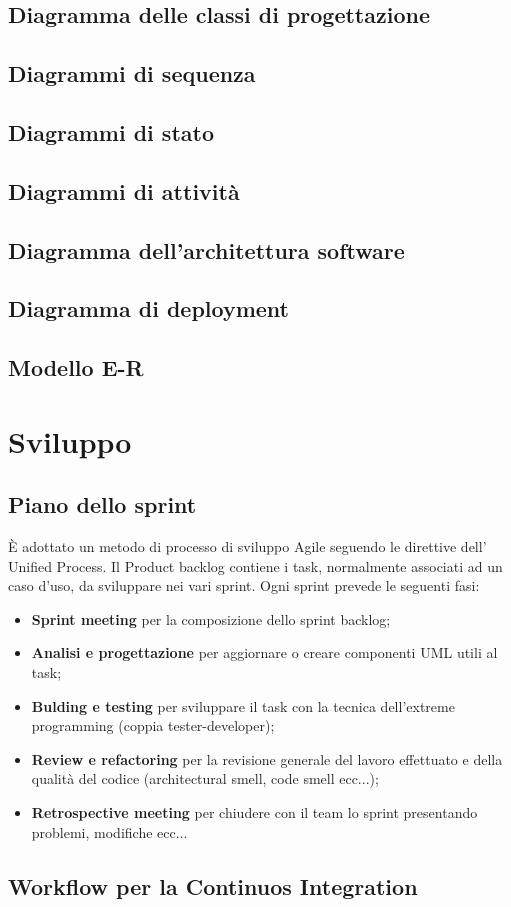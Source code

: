 \documentclass[12pt]{article}
\begin{document}
\subsection{Diagramma delle classi di progettazione}
\subsection{Diagrammi di sequenza}
\subsection{Diagrammi di stato}
\subsection{Diagrammi di attivit\`{a}}
\subsection{Diagramma dell'architettura software}
\subsection{Diagramma di deployment}
\subsection{Modello E-R}
\section{Sviluppo}
\subsection{Piano dello sprint}
\`{E} adottato un metodo di processo di sviluppo Agile seguendo le direttive dell' Unified Process. Il Product backlog contiene i task, normalmente associati ad un caso d'uso,  da sviluppare nei vari sprint. Ogni sprint prevede le seguenti fasi:
\begin{itemize}
\item {\textbf {Sprint meeting}} per la composizione dello sprint backlog;
\item {\textbf {Analisi e progettazione}}  per aggiornare o creare componenti UML utili al task;
\item {\textbf {Bulding e testing}}  per sviluppare il task con la tecnica dell'extreme programming (coppia tester-developer);
\item {\textbf {Review e refactoring}} per la revisione generale del lavoro effettuato e della qualità del codice (architectural smell, code smell ecc...);
\item {\textbf {Retrospective meeting}} per chiudere con il team lo sprint presentando problemi, modifiche ecc...

\end{itemize}

\subsection{Workflow per la Continuos Integration}


\end{document}
